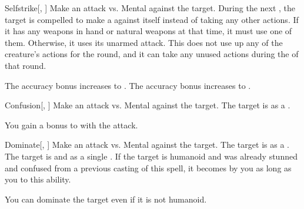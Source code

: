 \lowercase{\hypertarget{spell:Selfstrike}{}}\label{spell:Selfstrike}
\begin{freeability}[Rank 4]{\hypertarget{spell:Selfstrike}{Selfstrike}}[, ]
Make an attack vs. Mental against the target.
\hit During the next , the target is compelled to make a  against itself instead of taking any other actions.
If it has any weapons in hand or natural weapons at that time, it must use one of them.
Otherwise, it uses its unarmed attack.
This does not use up any of the creature's actions for the round, and it can take any unused actions during the  of that round.

\rankline
{} The accuracy bonus increases to .
 The accuracy bonus increases to .

\end{freeability}
\vspace{0.25em}



\lowercase{\hypertarget{spell:Confusion}{}}\label{spell:Confusion}
\begin{freeability}[Rank 5]{\hypertarget{spell:Confusion}{Confusion}}[, ]
Make an attack vs. Mental against the target.
\hit The target is \confused as a .

\rankline
{} You gain a  bonus to  with the attack.

\end{freeability}
\vspace{0.25em}



\lowercase{\hypertarget{spell:Dominate}{}}\label{spell:Dominate}
\begin{freeability}[Rank 5]{\hypertarget{spell:Dominate}{Dominate}}[, ]
Make an attack vs. Mental against the target.
\hit The target is  as a .
\crit The target is  and  as a single .
If the target is humanoid and was already stunned and confused from a previous casting of this spell, it becomes  by you as long as you  to this ability.

\rankline
{} You can dominate the target even if it is not humanoid.

\end{freeability}
\vspace{0.25em}



